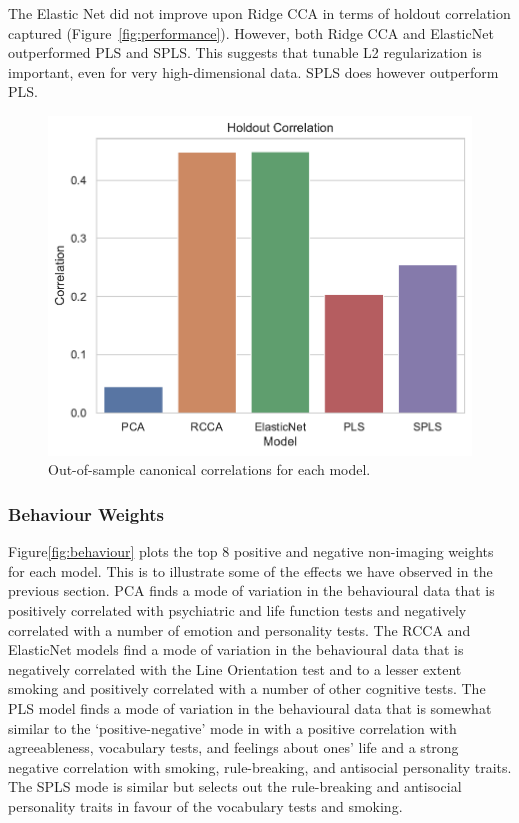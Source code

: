 The Elastic Net did not improve upon Ridge CCA in terms of holdout correlation captured (Figure~\ref{fig:performance}).
However, both Ridge CCA and ElasticNet outperformed PLS and SPLS.
This suggests that tunable L2 regularization is important, even for very high-dimensional data.
SPLS does however outperform PLS.

\begin{figure}
\centering
\includegraphics[width=0.5\linewidth]{figures/hcp/holdout_correlations}
\caption{Out-of-sample canonical correlations for each model.}
\end{figure}

\subsubsection{Behaviour Weights}

Figure\ref{fig:behaviour} plots the top 8 positive and negative non-imaging \gls{weights} for each model.
This is to illustrate some of the effects we have observed in the previous section.
PCA finds a mode of variation in the behavioural data that is positively correlated with psychiatric and life function tests and negatively correlated with a number of emotion and personality tests.
The RCCA and ElasticNet models find a mode of variation in the behavioural data that is negatively correlated with the Line Orientation test and to a lesser extent smoking and positively correlated with a number of other cognitive tests.
The PLS model finds a mode of variation in the behavioural data that is somewhat similar to the `positive-negative' mode in \cite{smith2015positive} with a positive correlation with agreeableness, vocabulary tests, and feelings about ones' life and a strong negative correlation with smoking, rule-breaking, and antisocial personality traits.
The SPLS mode is similar but selects out the rule-breaking and antisocial personality traits in favour of the vocabulary tests and smoking.

